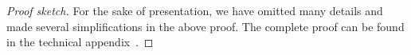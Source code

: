 \documentclass[format=acmsmall, review=true, screen=true]{acmart}
\renewcommand{\sectionname}{Section}
\newenvironment{toplas}%
    {\color{OliveGreen}}{}
\newcommand{\itoplassug}[1]{}
\begin{document}
\begin{toplas}
\begin{proof}[Proof sketch]
  For the sake of presentation, we have omitted many details and made several simplifications in the above proof.
  The complete proof can be found in the technical appendix~\citep{technical_appendix}.
  \end{proof}
\end{toplas}

\end{document}
